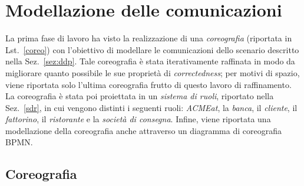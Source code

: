 \documentclass[11pt]{article} %
\begin{document}
\clearpage

\section{Modellazione delle comunicazioni}
\label{sez:modellazione}

La prima fase di lavoro ha visto la realizzazione di una \emph{coreografia} (riportata in Lst.~\ref{coreo}) con l'obiettivo di modellare le comunicazioni dello scenario descritto nella Sez.~\ref{sez:ddp}. Tale coreografia è stata iterativamente raffinata in modo da migliorare quanto possibile le sue proprietà di \emph{correctedness}; per motivi di spazio, viene riportata solo l'ultima coreografia frutto di questo lavoro di raffinamento. La coreografia è stata poi proiettata in un \emph{sistema di ruoli}, riportato nella Sez.~\ref{sdr}, in cui vengono distinti i seguenti ruoli: \emph{ACMEat}, la \emph{banca}, il \emph{cliente}, il \emph{fattorino}, il \emph{ristorante} e la \emph{società di consegna}. Infine, viene riportata una modellazione della coreografia anche attraverso un diagramma di coreografia BPMN.

\subsection{Coreografia}
\end{document}
